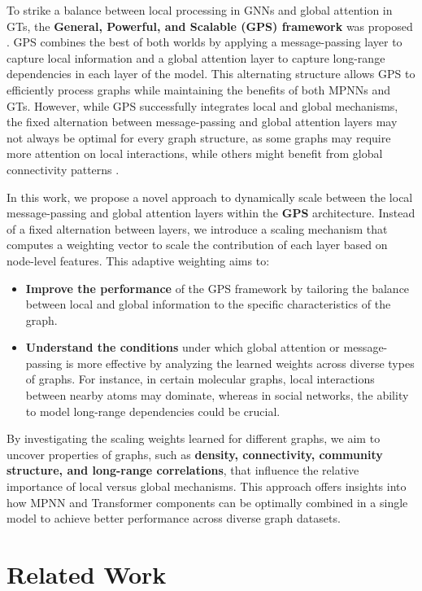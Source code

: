\documentclass{acmart}
\begin{document}
To strike a balance between local processing in GNNs and global attention in GTs, the \textbf{General, Powerful, and Scalable (GPS) framework} was proposed \cite{rampášek2023recipegeneralpowerfulscalable}. GPS combines the best of both worlds by applying a message-passing layer to capture local information and a global attention layer to capture long-range dependencies in each layer of the model. This alternating structure allows GPS to efficiently process graphs while maintaining the benefits of both MPNNs and GTs. However, while GPS successfully integrates local and global mechanisms, the fixed alternation between message-passing and global attention layers may not always be optimal for every graph structure, as some graphs may require more attention on local interactions, while others might benefit from global connectivity patterns \cite{Bronstein_2017}.

In this work, we propose a novel approach to dynamically scale between the local message-passing and global attention layers within the \textbf{GPS} architecture. Instead of a fixed alternation between layers, we introduce a scaling mechanism that computes a weighting vector to scale the contribution of each layer based on node-level features. This adaptive weighting aims to:

\begin{itemize}
    \item \textbf{Improve the performance} of the GPS framework by tailoring the balance between local and global information to the specific characteristics of the graph.
    \item \textbf{Understand the conditions} under which global attention or message-passing is more effective by analyzing the learned weights across diverse types of graphs. For instance, in certain molecular graphs, local interactions between nearby atoms may dominate, whereas in social networks, the ability to model long-range dependencies could be crucial.
\end{itemize}

By investigating the scaling weights learned for different graphs, we aim to uncover properties of graphs, such as \textbf{density, connectivity, community structure, and long-range correlations}, that influence the relative importance of local versus global mechanisms. This approach offers insights into how MPNN and Transformer components can be optimally combined in a single model to achieve better performance across diverse graph datasets.

\section{Related Work}
\end{document}
